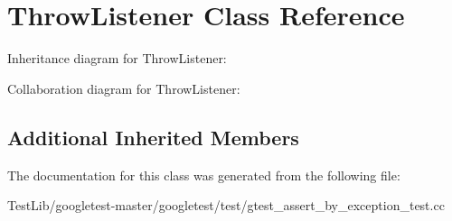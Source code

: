 \hypertarget{classThrowListener}{}\section{Throw\+Listener Class Reference}
\label{classThrowListener}


Inheritance diagram for Throw\+Listener\+:


Collaboration diagram for Throw\+Listener\+:
\subsection*{Additional Inherited Members}


The documentation for this class was generated from the following file\+:\begin{DoxyCompactItemize}
\item 
Test\+Lib/googletest-\/master/googletest/test/gtest\+\_\+assert\+\_\+by\+\_\+exception\+\_\+test.\+cc\end{DoxyCompactItemize}
